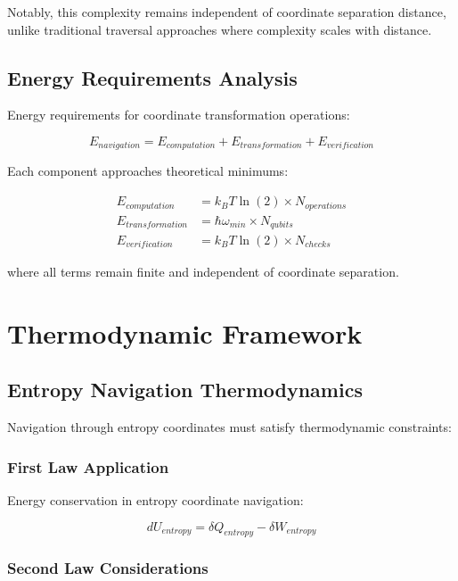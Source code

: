 \documentclass[12pt,a4paper]{article}
\begin{document}
Notably, this complexity remains independent of coordinate separation distance, unlike traditional traversal approaches where complexity scales with distance.

\subsection{Energy Requirements Analysis}

Energy requirements for coordinate transformation operations:

\begin{equation}
E_{navigation} = E_{computation} + E_{transformation} + E_{verification}
\label{eq:energy_navigation}
\end{equation}

Each component approaches theoretical minimums:

\begin{align}
E_{computation} &= k_B T \ln(2) \times N_{operations} \\
E_{transformation} &= \hbar \omega_{min} \times N_{qubits} \\
E_{verification} &= k_B T \ln(2) \times N_{checks}
\end{align}

where all terms remain finite and independent of coordinate separation.

\section{Thermodynamic Framework}

\subsection{Entropy Navigation Thermodynamics}

Navigation through entropy coordinates must satisfy thermodynamic constraints:

\subsubsection{First Law Application}

Energy conservation in entropy coordinate navigation:

\begin{equation}
dU_{entropy} = \delta Q_{entropy} - \delta W_{entropy}
\label{eq:first_law_entropy}
\end{equation}

\subsubsection{Second Law Considerations}
\end{document}
